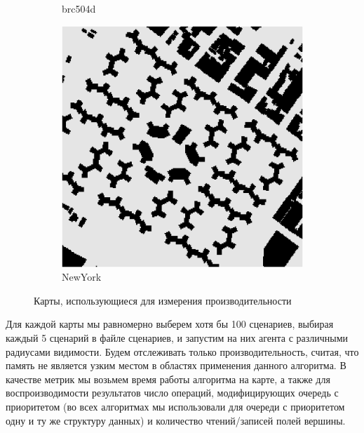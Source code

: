 \documentclass[11pt]{article}
\begin{document}
\begin{figure}
\begin{subfigure}[b]{0.24\textwidth}
            \caption{brc504d}
        \end{subfigure}
        \begin{subfigure}[b]{0.24\textwidth}
            \centering
            \includegraphics[width=\textwidth]{../maps/NewYork_1_256}
            \caption{NewYork}
        \end{subfigure}
        \caption{Карты, использующиеся для измерения производительности}
        \label{fig:maps}
    \end{figure}

    Для каждой карты мы равномерно выберем хотя бы 100 сценариев, выбирая каждый 5 сценарий в файле сценариев, и запустим на них агента с различными радиусами видимости.
    Будем отслеживать только производительность, считая, что память не является узким местом в областях применения данного алгоритма.
    В качестве метрик мы возьмем время работы алгоритма на карте, а также для воспроизводимости результатов число операций, модифицирующих очередь с приоритетом (во всех алгоритмах мы использовали для очереди с приоритетом одну и ту же структуру данных) и количество чтений/записей полей вершины.
\end{document}
